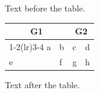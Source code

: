 \documentclass[12pt]{article}
\begin{document}
Text before the table.

\begin{tabular}{llll}\toprule \multicolumn{2}{c}{G1} & \multicolumn{2}{c}{G2}\\\cmidrule(lr){1-2}\cmidrule(lr){3-4} a & b & c & d\\\midrule e & f & g & h\\\bottomrule\end{tabular}

Text after the table.
\end{document}
